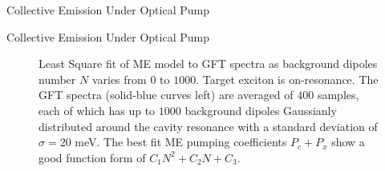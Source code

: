 \documentclass{beamer}
\begin{document}
\begin{frame}{Collective Emission Under Optical Pump}
\end{frame}



\begin{frame}{Collective Emission Under Optical Pump}

\begin{figure}[h]%
     \centering
     \caption[Pumping as a tool for dipoles excitation.]{ \fontsize{8}{0.2}\selectfont
       Least Square fit of ME model to GFT spectra as background dipoles number $N$ varies from $0$ to $1000$. Target exciton is on-resonance.  The GFT spectra (solid-blue curves left) are averaged of $400$ samples, each of which has up to $1000$ background dipoles Gaussianly distributed around the cavity resonance with a standard deviation of $\sigma=20$ meV. The best fit ME pumping coefficients $P_c+P_x$ show a good function form of $C_1N^2+C_2N+C_3$.
       }
 \end{figure}
\end{frame}
\end{document}
